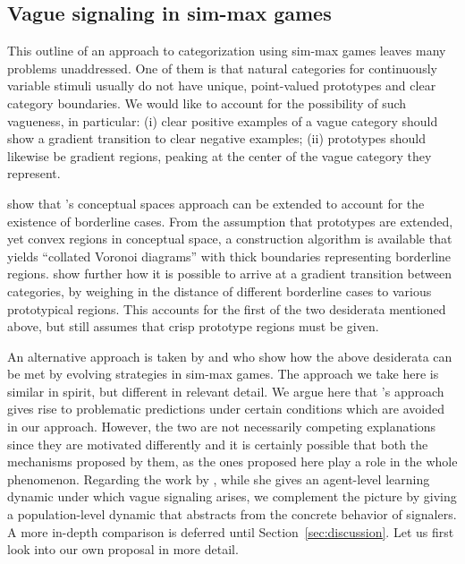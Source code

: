 \documentclass[fleqn,reqno,10pt]{article}
\begin{document}
\subsection{Vague signaling in sim-max games}

This outline of an approach to categorization using sim-max games
leaves many problems unaddressed. One of them is that natural
categories for continuously variable stimuli usually do not have
unique, point-valued prototypes and clear category boundaries. We
would like to account for the possibility of such vagueness, in
particular: (i) clear positive examples of a vague category should
show a gradient transition to clear negative examples;
(ii) prototypes should likewise be gradient regions, peaking at the
center of the vague category they represent.

\citet{DouvenDecock2011:Vagueness:-A-Co} show that
\citeauthor{Gardenfors2000:Conceptual-Spac}'s conceptual spaces
approach can be extended to account for the existence of borderline
cases. From the assumption that prototypes are extended, yet convex
regions in conceptual space, a construction algorithm is available
that yields ``collated Voronoi diagrams'' with thick boundaries
representing borderline
regions. \citet{DecockDouven2012:What-is-Graded-} show further how it
is possible to arrive at a gradient transition between categories, by
weighing in the distance of different borderline cases to various
prototypical regions. This accounts for the first of the two
desiderata mentioned above, but still assumes that crisp prototype
regions must be given.

An alternative approach is taken by
\citet{FrankeJager2010:Vagueness-Signa} and
\citet{OConnor2013:The-Evolution-o} who show how the above desiderata
can be met by evolving strategies in sim-max games. The approach we
take here is similar in spirit, but different in relevant detail. We
argue here that \citeauthor{FrankeJager2010:Vagueness-Signa}'s
approach gives rise to problematic predictions under certain conditions
which are avoided in our approach. However, the two are not necessarily
competing explanations since they are motivated differently and it is
certainly possible that both the mechanisms proposed by them, as the
ones proposed here play a role in the whole phenomenon.
Regarding the work by \citeauthor{OConnor2013:The-Evolution-o}, while she
gives an agent-level learning dynamic under which vague signaling arises,
we complement the picture by giving a population-level dynamic that
abstracts from the concrete behavior of signalers. A more in-depth
comparison is deferred until Section~\ref{sec:discussion}. Let us
first look into our own proposal in more detail.
\end{document}
